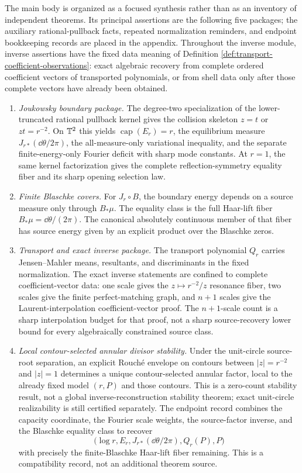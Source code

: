 The main body is organized as a focused synthesis rather than as an
inventory of independent theorems.  Its principal assertions are the
following five packages; the auxiliary rational-pullback facts, repeated
normalization reminders, and endpoint bookkeeping records are placed in
the appendix.
Throughout the inverse module, inverse assertions have the fixed data
meaning of Definition \ref{def:transport-coefficient-observations}:
exact algebraic recovery from complete ordered coefficient vectors of
transported polynomials, or from shell data only after those complete
vectors have already been obtained.
\begin{enumerate}[label=\textup{(\arabic*)},leftmargin=*]
  \item \emph{Joukowsky boundary package.}
  The degree-two specialization of the lower-truncated rational pullback
  kernel gives the collision skeleton \(z=t\) or \(zt=r^{-2}\).  On
  \(\mathbb{T}^2\) this yields \(\operatorname{cap}(E_r)=r\), the equilibrium
  measure \(J_{r\ast}(\dd\theta/2\pi)\), the all-measure-only
  variational inequality, and the separate finite-energy-only Fourier
  deficit with sharp mode constants.  At \(r=1\), the same kernel
  factorization gives the complete reflection-symmetry equality fiber
  and its sharp opening selection law.
  \item \emph{Finite Blaschke covers.}  For \(J_r\circ B\), the boundary
  energy depends on a source measure only through \(B_\ast\mu\).  The
  equality class is the full Haar-lift fiber
  \(B_\ast\mu=\dd\theta/(2\pi)\).  The canonical absolutely continuous
  member of that fiber has source energy given by an explicit product
  over the Blaschke zeros.
  \item \emph{Transport and exact inverse package.}  The transport
  polynomial \(Q_r\) carries Jensen--Mahler means, resultants, and
  discriminants in the fixed normalization.  The exact inverse
  statements are confined to complete coefficient-vector data: one scale
  gives the \(z\mapsto r^{-2}/z\) resonance fiber, two scales give the
  finite perfect-matching graph, and \(n+1\) scales give the
  Laurent-interpolation coefficient-vector proof.  The \(n+1\)-scale
  count is a sharp interpolation budget for that proof, not a sharp
  source-recovery lower bound for every algebraically constrained source
  class.
  \item \emph{Local contour-selected annular divisor stability.}  Under the unit-circle
  source-root separation, an explicit Rouch\'e envelope on contours
  between \(|z|=r^{-2}\) and \(|z|=1\) determines a unique
  contour-selected annular factor, local to the already fixed model
  \((r,P)\) and those contours.  This is a zero-count stability result,
  not a global inverse-reconstruction stability theorem; exact
  unit-circle realizability is still certified separately.  The endpoint record combines the
  capacity coordinate, the Fourier scale weights, the source-factor
  inverse, and the Blaschke equality class to recover
  \[
  \bigl(\log r,E_r,J_{r\ast}(\dd\theta/2\pi),Q_r(P),P\bigr)
  \]
  with precisely the finite-Blaschke Haar-lift fiber remaining.  This is
  a compatibility record, not an additional theorem source.
\end{enumerate}

